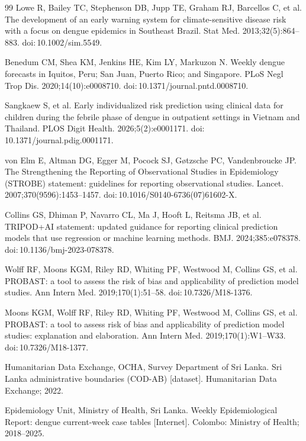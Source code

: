 \documentclass[11pt,a4paper]{article}
\begin{document}
\begin{thebibliography}{99}
 Lowe R, Bailey TC, Stephenson DB, Jupp TE, Graham RJ, Barcellos C, et al. The development of an early warning system for climate-sensitive disease risk with a focus on dengue epidemics in Southeast Brazil. Stat Med. 2013;32(5):864--883. doi:\,10.1002/sim.5549.

 Benedum CM, Shea KM, Jenkins HE, Kim LY, Markuzon N. Weekly dengue forecasts in Iquitos, Peru; San Juan, Puerto Rico; and Singapore. PLoS Negl Trop Dis. 2020;14(10):e0008710. doi:\,10.1371/journal.pntd.0008710.

 Sangkaew S, et al. Early individualized risk prediction using clinical data for children during the febrile phase of dengue in outpatient settings in Vietnam and Thailand. PLOS Digit Health. 2026;5(2):e0001171. doi:\,10.1371/journal.pdig.0001171.

 von Elm E, Altman DG, Egger M, Pocock SJ, G\o tzsche PC, Vandenbroucke JP. The Strengthening the Reporting of Observational Studies in Epidemiology (STROBE) statement: guidelines for reporting observational studies. Lancet. 2007;370(9596):1453--1457. doi:\,10.1016/S0140-6736(07)61602-X.

 Collins GS, Dhiman P, Navarro CL, Ma J, Hooft L, Reitsma JB, et al. TRIPOD+AI statement: updated guidance for reporting clinical prediction models that use regression or machine learning methods. BMJ. 2024;385:e078378. doi:\,10.1136/bmj-2023-078378.

 Wolff RF, Moons KGM, Riley RD, Whiting PF, Westwood M, Collins GS, et al. PROBAST: a tool to assess the risk of bias and applicability of prediction model studies. Ann Intern Med. 2019;170(1):51--58. doi:\,10.7326/M18-1376.

 Moons KGM, Wolff RF, Riley RD, Whiting PF, Westwood M, Collins GS, et al. PROBAST: a tool to assess risk of bias and applicability of prediction model studies: explanation and elaboration. Ann Intern Med. 2019;170(1):W1--W33. doi:\,10.7326/M18-1377.

 Humanitarian Data Exchange, OCHA, Survey Department of Sri Lanka. Sri Lanka administrative boundaries (COD-AB) [dataset]. Humanitarian Data Exchange; 2022.

 Epidemiology Unit, Ministry of Health, Sri Lanka. Weekly Epidemiological Report: dengue current-week case tables [Internet]. Colombo: Ministry of Health; 2018--2025.


\end{thebibliography}
\end{document}
